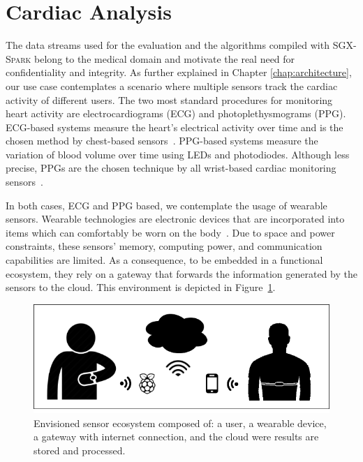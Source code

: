 \section{Cardiac Analysis} \label{sec:background:med}
The data streams used for the evaluation and the algorithms compiled with \textsc{SGX-Spark} belong to the medical domain and motivate the real need for confidentiality and integrity. 
As further explained in Chapter \ref{chap:architecture}, our use case contemplates a scenario where multiple sensors track the cardiac activity of different users.
The two most standard procedures for monitoring heart activity are electrocardiograms (ECG) and photoplethysmograms (PPG).
ECG-based systems measure the heart's electrical activity over time and is the chosen method by chest-based sensors~\cite{Tamura2018}.
PPG-based systems measure the variation of blood volume over time using LEDs and photodiodes.
Although less precise, PPGs are the chosen technique by all wrist-based cardiac monitoring sensors~\cite{Parak2015}.

In both cases, ECG and PPG based, we contemplate the usage of wearable sensors.
Wearable technologies are electronic devices that are incorporated into items which can comfortably be worn on the body~\cite{WearableDevices}.
Due to space and power constraints, these sensors' memory, computing power, and communication capabilities are limited.
As a consequence, to be embedded in a functional ecosystem, they rely on a gateway that forwards the information generated by the sensors to the cloud.
This environment is depicted in Figure~\ref{fig:wearable-ecosystem}.
\begin{figure}[h!]
    \centering
    \includegraphics[width=.8\textwidth]{./img/wearable-ecosystem.png}
    \caption[Envisioned user-sensor ecosystem.]{Envisioned sensor ecosystem composed of: a user, a wearable device, a gateway with internet connection, and the cloud were results are stored and processed.\label{fig:wearable-ecosystem}}
\end{figure}


